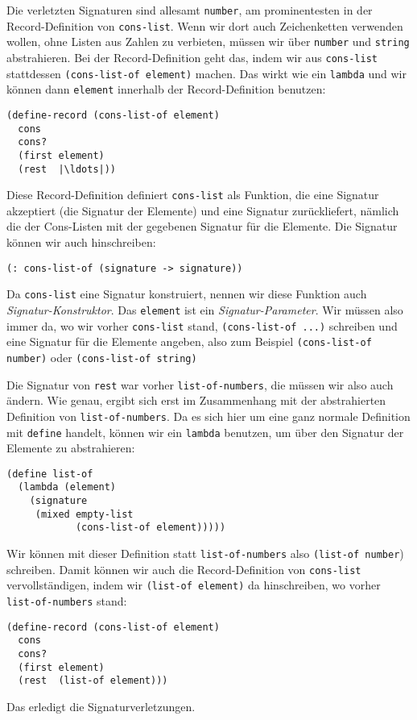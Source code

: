 Die verletzten Signaturen sind allesamt \lstinline{number}, am
prominentesten in der Record-Definition von \lstinline{cons-list}.
Wenn wir dort auch Zeichenketten verwenden wollen, ohne Listen aus
Zahlen zu verbieten, müssen wir über
\lstinline{number} und \lstinline{string} abstrahieren.  Bei der
Record-Definition geht das, indem wir aus \lstinline{cons-list} stattdessen
\lstinline{(cons-list-of element)} machen.
Das wirkt wie ein
\lstinline{lambda} und wir können dann \lstinline{element} innerhalb
der Record-Definition benutzen:\label{function:cons-list-of}
%
\begin{lstlisting}
(define-record (cons-list-of element)
  cons
  cons?
  (first element)
  (rest  |\ldots|))
\end{lstlisting}
%
Diese Record-Definition definiert \lstinline{cons-list} als Funktion,
die eine Signatur akzeptiert (die Signatur der Elemente) und eine
Signatur zurückliefert, nämlich die der Cons-Listen mit der gegebenen
Signatur für die Elemente.  Die Signatur können wir auch hinschreiben:
%
\begin{lstlisting}
(: cons-list-of (signature -> signature))
\end{lstlisting}
%
Da \lstinline{cons-list} eine Signatur konstruiert, nennen wir diese
Funktion auch \textit{Signatur-Konstruktor}.
Das \lstinline{element} ist ein \textit{Signatur-Parameter}.
Wir müssen also immer da, wo wir vorher \lstinline{cons-list} stand,
\lstinline{(cons-list-of ...)} schreiben und eine Signatur für die
Elemente angeben, also zum Beispiel \lstinline{(cons-list-of number)}
oder \lstinline{(cons-list-of string)}

Die Signatur von \lstinline{rest} war vorher
\lstinline{list-of-numbers}, die müssen wir also auch ändern.  Wie
genau, ergibt sich erst im Zusammenhang mit der abstrahierten
Definition von \lstinline{list-of-numbers}.  Da es sich hier um eine
ganz normale Definition mit \lstinline{define} handelt, können wir ein
\lstinline{lambda} benutzen, um über den Signatur der Elemente zu
abstrahieren:
%
\begin{lstlisting}
(define list-of
  (lambda (element)
    (signature
     (mixed empty-list
            (cons-list-of element)))))
\end{lstlisting}
%
Wir können mit dieser Definition statt \lstinline{list-of-numbers} also
\lstinline{(list-of number}) schreiben.  Damit können wir auch die
Record-Definition von \lstinline{cons-list} vervollständigen, indem
wir \lstinline{(list-of element)} da hinschreiben, wo vorher
\lstinline{list-of-numbers} stand:
%
\begin{lstlisting}
(define-record (cons-list-of element)
  cons
  cons?
  (first element)
  (rest  (list-of element)))
\end{lstlisting}
%
Das erledigt die Signaturverletzungen.

